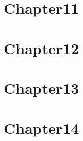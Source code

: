 \documentclass[10pt]{article}
\begin{document}
  \newpage
  \section*{Chapter11}
  
  
  \newpage
  \section*{Chapter12}
  
  
  \newpage
  \section*{Chapter13}
  
  
  
  \newpage
  \section*{Chapter14}
  
\end{document}
